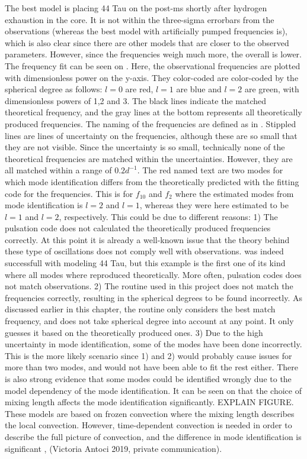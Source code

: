The best model is placing 44 Tau on the post-ms shortly after hydrogen exhaustion in the core. It is not within the three-sigma errorbars from the observations (whereas the best model with artificially pumped frequencies is), which is also clear since there are other models that are closer to the observed parameters. However, since the frequencies weigh much more, the overall \chis is lower. The frequency fit can be seen on . Here, the observational frequencies are plotted with dimensionless power on the y-axis. They color-coded are color-coded by the spherical degree as follows: $l=0$ are red, $l=1$ are blue and  $l=2$ are green, with dimensionless powers of 1,2 and 3. The black lines indicate the matched theoretical frequency, and the gray lines at the bottom represents all theoretically produced frequencies. The naming of the frequencies are defined as in . Stippled lines are lines of uncertainty on the frequencies, although these are so small that they are not visible. Since the uncertainty is so small, technically none of the theoretical frequencies are matched within the uncertainties. However, they are all matched within a range of $0.2 d^{-1}$. The red named text are two modes for which mode identification differs from the theoretically predicted with the \chis fitting code for the frequencies. This is for $f_10$ and $f_2$ where the estimated modes from mode identification is $l=2$ and $l=1$, whereas they were here estimated to be $l=1$ and $l=2$, respectively. This could be due to different reasons: 1) The pulsation code does not calculated the theoretically produced frequencies correctly. At this point it is already a well-known issue that the theory behind these type of oscillations does not comply well with observations. \citet{lenz2010delta} was indeed successfull with modeling 44 Tau, but this example is the first one of its kind where all modes where reproduced theoretically. More often, pulsation codes does not match observations. 
2)  The \chis routine used in this project does not match the frequencies correctly, resulting in the spherical degrees to be found incorrectly. As discussed earlier in this chapter, the routine only considers the best match frequency, and does not take spherical degree into account at any point. It only guesses it based on the theoretically produced ones. 
3) Due to the high uncertainty in mode identification, some of the modes have been done incorrectly. This is the more likely scenario since 1) and 2) would probably cause issues for more than two modes, and would not have been able to fit the rest either. There is also strong evidence that some modes could be identified wrongly due to the model dependency of the mode identification. It can be seen on  that the choice of mixing length affects the mode identification significantly. EXPLAIN FIGURE. These models are based on frozen convection where the mixing length describes the local convection. However, time-dependent convection is needed in order to describe the full picture of convection, and the difference in mode identification is significant \citep{dupret2005time}, (Victoria Antoci 2019, private communication).

